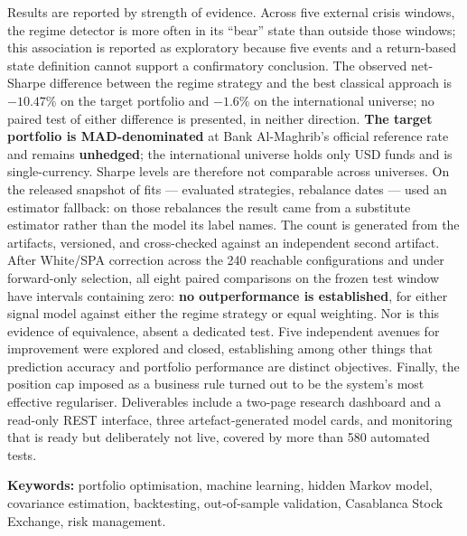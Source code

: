 Results are reported by strength of evidence. Across five external crisis
windows, the regime detector is more often in its ``bear'' state than outside
those windows; this association is reported as exploratory because five events
and a return-based state definition cannot support a confirmatory conclusion.
The observed net-Sharpe difference between the regime strategy and the best
classical approach is $-10.47$\% on the target portfolio and $-1.6$\% on the
international universe; no paired test of either difference is presented, in
neither direction. \textbf{The target portfolio is MAD-denominated} at Bank
Al-Maghrib's official reference rate and remains \textbf{unhedged}; the
international universe holds only USD funds and is single-currency. Sharpe
levels are therefore not comparable across universes. On the released snapshot
\integriteReplis{} of \integriteAjustements{} fits — \integriteStrategies{} evaluated
strategies, \integriteDates{} rebalance dates — used an estimator fallback: on those
rebalances the result came from a substitute estimator rather than the model its
label names. The count is generated from the artifacts, versioned, and cross-checked
against an independent second artifact. After White/SPA
correction across the 240 reachable configurations and under forward-only
selection, all eight paired comparisons on the frozen test
window have intervals containing zero: \textbf{no outperformance is established},
for either signal model against either the regime strategy or equal weighting.
Nor is this evidence of equivalence, absent a dedicated test.
Five independent avenues for improvement were explored and closed, establishing
among other things that prediction accuracy and portfolio performance are
distinct objectives. Finally, the position cap imposed as a business rule turned
out to be the system's most effective regulariser. Deliverables include a
two-page research dashboard and a read-only REST interface, three
artefact-generated model cards, and monitoring that is ready but deliberately
not live, covered by more than 580 automated tests.

\vspace{0.6em}
\noindent\textbf{Keywords:} portfolio optimisation, machine learning, hidden
Markov model, covariance estimation, backtesting, out-of-sample validation,
Casablanca Stock Exchange, risk management.
